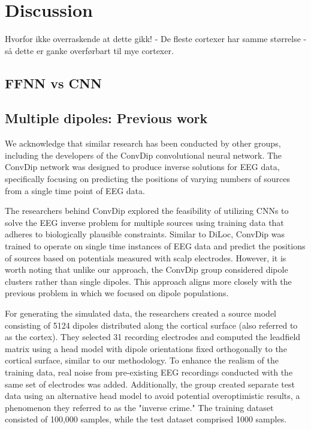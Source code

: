 \documentclass[a4paper, UKenglish, 11pt]{uiomaster}
\begin{document}
\chapter{Discussion}

Hvorfor ikke overraskende at dette gikk!
- De fleste cortexer har samme størrelse - så dette er ganke overførbart til mye cortexer. 

\section{FFNN vs CNN}

\section{Multiple dipoles: Previous work}
We acknowledge that similar research has been conducted by other groups, including the developers of the ConvDip convolutional neural network. The ConvDip network was designed to produce inverse solutions for EEG data, specifically focusing on predicting the positions of varying numbers of sources from a single time point of EEG data.

The researchers behind ConvDip explored the feasibility of utilizing CNNs to solve the EEG inverse problem for multiple sources using training data that adheres to biologically plausible constraints. Similar to DiLoc, ConvDip was trained to operate on single time instances of EEG data and predict the positions of sources based on potentials measured with scalp electrodes. However, it is worth noting that unlike our approach, the ConvDip group considered dipole clusters rather than single dipoles. This approach aligns more closely with the previous problem in which we focused on dipole populations.

For generating the simulated data, the researchers created a source model consisting of 5124 dipoles distributed along the cortical surface (also referred to as the cortex). They selected 31 recording electrodes and computed the leadfield matrix using a head model with dipole orientations fixed orthogonally to the cortical surface, similar to our methodology. To enhance the realism of the training data, real noise from pre-existing EEG recordings conducted with the same set of electrodes was added. Additionally, the group created separate test data using an alternative head model to avoid potential overoptimistic results, a phenomenon they referred to as the "inverse crime." The training dataset consisted of 100,000 samples, while the test dataset comprised 1000 samples.
\end{document}
